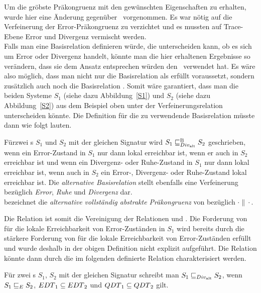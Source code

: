 Um die gröbste Präkongruenz mit den gewünschten Eigenschaften zu erhalten,
wurde hier eine Änderung gegenüber~\cite{Chilton2013} vorgenommen. Es
war nötig auf die Verfeinerung der Error-Präkongruenz zu verzichtet und es
mussten auf Trace-Ebene Error und Divergenz vermischt werden.\\
Falls man eine Basisrelation definieren würde, die unterscheiden kann, ob es
sich um Error oder Divergenz handelt, könnte man die hier erhaltenen
Ergebnisse so verändern, dass sie dem Ansatz entsprechen würden
den~\cite{Chilton2013} verwendet hat. Es wäre also möglich, dass man nicht nur
die Basisrelation \DBRel{} als erfüllt voraussetzt, sondern zusätzlich auch
noch die Basisrelation \EBRel{}. Somit wäre garantiert, dass man die beiden
Systeme $S_1$ (siehe dazu Abbildung~\ref{S1}) und $S_2$ (siehe dazu
Abbildung~\ref{S2}) aus dem Beispiel oben unter der Verfeinerungsrelation
unterscheiden könnte. Die Definition für die zu verwendende Basisrelation
müsste dann wie folgt lauten.

\begin{Def}
  Für\linebreak zwei \EIO{}s $S_1$ und $S_2$ mit der gleichen Signatur wird $S_1\sqsubseteq _{Div_{\mathrm{alt}}}^\mathrm{B}{}
  S_2$ geschrieben, wenn ein Error-Zustand in $S_1$ nur dann lokal erreichbar
  ist, wenn er auch in $S_2$ erreichbar ist und wenn ein Divergenz- oder
  Ruhe-Zustand in $S_1$ nur dann lokal erreichbar ist, wenn auch in $S_2$ ein
  Error-, Divergenz- oder Ruhe-Zustand lokal erreichbar ist. Die
  \emph{alternative Basisrelation} stellt ebenfalls eine Verfeinerung bezüglich
  \emph{Error}, \emph{Ruhe} und \emph{Divergenz} dar.\\
  \DCaRel{} bezeichnet die \emph{alternative vollständig abstrakte
  Präkongruenz} von \DBaRel{} bezüglich $\cdot\|\cdot$.
\end{Def}

Die Relation \DBaRel{} ist somit die Vereinigung der Relationen \EBRel{} und
\DBRel{}. Die Forderung von \DBRel{} für die lokale Erreichbarkeit von
Error-Zuständen in $S_1$ wird bereits durch die stärkere Forderung von \EBRel{}
für die lokale Erreichbarkeit von Error-Zuständen erfüllt und
wurde deshalb in der obigen Definition nicht explizit aufgeführt. Die Relation
\DCaRel{} könnte dann durch die im folgenden definierte Relation charakterisiert
werden.

\begin{Def}
  Für zwei \EIO{}s $S_1$, $S_2$ mit der gleichen Signatur schreibt
  man\linebreak
  $S_1\sqsubseteq _{Div_{\mathrm{alt}}}{} S_2$, wenn $S_1 \sqsubseteq _E{} S_2$, $EDT{}_1\subseteq
  EDT{}_2$ und $QDT{}_1\subseteq QDT{}_2$ gilt.
\end{Def}

